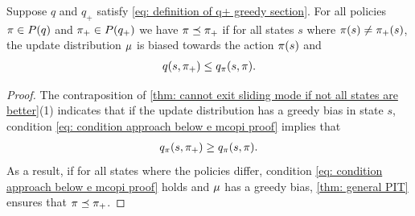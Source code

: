 \begin{lemma}
\label{thm: greedy bias mces policy improves}
Suppose $q$ and $q_+$ satisfy \eqref{eq: definition of q+ greedy section}.
For all policies $\pi \in P(q)$ and $\pi_+ \in P(q_+)$ we have $\pi \preceq \pi_+$ if for all states $s$ where $\pi(s) \neq \pi_+(s)$, the update distribution $\mu$ is biased towards the action $\pi(s)$ and
\begin{align}
\label{eq: condition approach below e mcopi proof}
    q(s, \pi_+) \leq q_\pi(s, \pi) .
\end{align}
\end{lemma}
\vspace{-0.8cm}
\begin{proof}
The contraposition of \autoref{thm: cannot exit sliding mode if not all states are better}(1) indicates that
if the update distribution has a greedy bias in state $s$, condition \eqref{eq: condition approach below e mcopi proof} implies that
\begin{align}
    q_{\pi}(s, \pi_+) \geq q_{\pi}(s, \pi) .
\end{align}
As a result, if for all states where the policies differ, condition \eqref{eq: condition approach below e mcopi proof} holds and $\mu$ has a greedy bias,
\autoref{thm: general PIT} ensures that $\pi \preceq \pi_+$.
\end{proof}